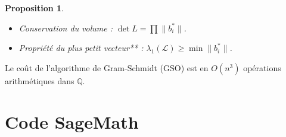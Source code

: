 \documentclass[a4paper,12pt]{report}  %
\theoremstyle{definitionstyle}
\theoremstyle{examplestyle}
\theoremstyle{remarkstyle}
\theoremstyle{propositionstyle}
\newtheorem{proposition}{Proposition}[chapter]  %
\theoremstyle{theoremstyle}
\begin{document}
	
	\begin{proposition}
		\begin{itemize}
			\item Conservation du volume : \( \det L = \prod \| b_i^* \| \).
			\item Propriété du plus petit vecteur** : \( \lambda_1(\mathcal{L}) \geq \min \| b_i^* \| \).
		\end{itemize}
	\end{proposition}	
	
	Le coût de l'algorithme de Gram-Schmidt (GSO) est en \( O(n^3) \) opérations arithmétiques dans \( \mathbb{Q} \).
	
	\chapter{Code SageMath}

	
	\printbibliography
	
\end{document}
